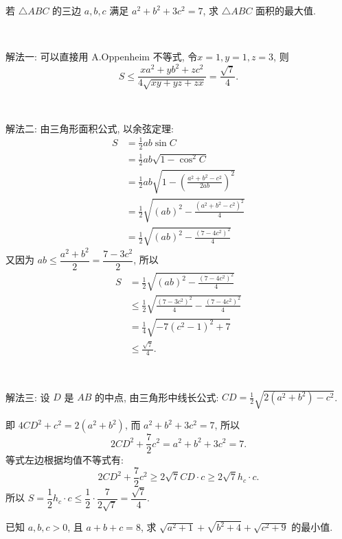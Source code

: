 \newpage
若 $\triangle ABC$ 的三边 $a,b,c$ 满足 $a^2+b^2+3c^2=7$, 求 $\triangle ABC$ 面积的最大值.

~

\noindent 解法一: 可以直接用 A.Oppenheim 不等式, 令$x=1,y=1,z=3$, 则
\[S\le\frac{xa^2+yb^2+zc^2}{4\sqrt{xy+yz+zx}} = \frac{\sqrt{7}}{4}. \]

~

\noindent 解法二: 由三角形面积公式, 以余弦定理:
\begin{align*}
S &= \frac{1}{2}ab\sin C \\
&= \frac{1}{2}ab\sqrt{1-\cos^2 C}\\
&= \frac{1}{2}ab\sqrt{1-\left(\frac{a^2+b^2-c^2}{2ab}\right)^2}\\
&= \frac{1}{2}\sqrt{(ab)^2-\frac{(a^2+b^2-c^2)^2}{4}}\\
&=\frac{1}{2}\sqrt{(ab)^2-\frac{(7-4c^2)^2}{4}}
\end{align*}
又因为 $ab\le\dfrac{a^2+b^2}{2}=\dfrac{7-3c^2}{2}$, 所以
\begin{align*}
S &=\frac{1}{2}\sqrt{(ab)^2-\frac{(7-4c^2)^2}{4}}\\
& \le\frac{1}{2}\sqrt{\frac{(7-3c^2)^2}{4}-\frac{(7-4c^2)^2}{4}}\\
&= \frac{1}{4}\sqrt{-7(c^2-1)^2+7}\\
&\le \frac{\sqrt{7}}{4}.
\end{align*}

~

\noindent 解法三: 设 $D$ 是 $AB$ 的中点, 由三角形中线长公式: $\displaystyle CD = \frac{1}{2}\sqrt{2(a^2+b^2)-c^2}$.

即 $4CD^2 + c^2 = 2(a^2+b^2)$, 而 $a^2+b^2+3c^2=7$, 所以
\[2CD^2+\frac{7}{2}c^2=a^2+b^2+3c^2=7.\]
等式左边根据均值不等式有: 
\[2CD^2+\frac{7}{2}c^2 \ge 2\sqrt{7}CD\cdot c\ge 2\sqrt{7}h_c\cdot c.\]
所以 $S=\dfrac{1}{2}h_c\cdot c \le \dfrac{1}{2}\cdot\dfrac{7}{2\sqrt{7}}=\dfrac{\sqrt{7}}{4}.$

\newpage

已知 $a,b,c > 0$, 且 $a+b+c=8$, 求 $\sqrt{a^2+1}+\sqrt{b^2+4}+\sqrt{c^2+9}$ 的最小值.

~

